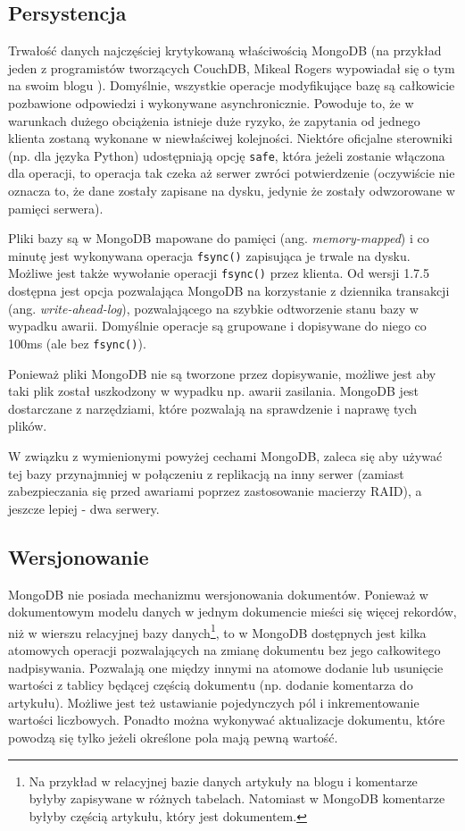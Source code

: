 \subsection*{Persystencja}

Trwałość danych najczęściej krytykowaną właściwością MongoDB (na przykład jeden z programistów tworzących CouchDB, Mikeal Rogers wypowiadał się o tym na swoim blogu \cite{mongodb-durability}).
Domyślnie, wszystkie operacje modyfikujące bazę są całkowicie pozbawione odpowiedzi i wykonywane asynchronicznie.
Powoduje to, że w warunkach dużego obciążenia istnieje duże ryzyko, że zapytania od jednego klienta zostaną wykonane w niewłaściwej kolejności.
Niektóre oficjalne sterowniki (np. dla języka Python) udostępniają opcję \verb+safe+, która jeżeli zostanie włączona dla operacji, to operacja tak czeka aż serwer zwróci potwierdzenie (oczywiście nie oznacza to, że dane zostały zapisane na dysku, jedynie że zostały odwzorowane w pamięci serwera).

Pliki bazy są w MongoDB mapowane do pamięci (ang. \emph{memory-mapped}) i co minutę jest wykonywana operacja \verb+fsync()+ zapisująca je trwale na dysku.
Możliwe jest także wywołanie operacji \verb+fsync()+ przez klienta.
Od wersji 1.7.5 dostępna jest opcja pozwalająca MongoDB na korzystanie z dziennika transakcji (ang. \emph{write-ahead-log}), pozwalającego na szybkie odtworzenie stanu bazy w wypadku awarii.
Domyślnie operacje są grupowane i dopisywane do niego co 100ms (ale bez \verb+fsync()+).

Ponieważ pliki MongoDB nie są tworzone przez dopisywanie, możliwe jest aby taki plik został uszkodzony w wypadku np. awarii zasilania.
MongoDB jest dostarczane z narzędziami, które pozwalają na sprawdzenie i naprawę tych plików.

W związku z wymienionymi powyżej cechami MongoDB, zaleca się aby używać tej bazy przynajmniej w połączeniu z replikacją na inny serwer (zamiast zabezpieczania się przed awariami poprzez zastosowanie macierzy RAID), a jeszcze lepiej - dwa serwery.

\subsection*{Wersjonowanie}

MongoDB nie posiada mechanizmu wersjonowania dokumentów.
Ponieważ w dokumentowym modelu danych w jednym dokumencie mieści się więcej rekordów, niż w wierszu relacyjnej bazy danych\footnote{Na przykład w relacyjnej bazie danych artykuły na blogu i komentarze byłyby zapisywane w różnych tabelach. Natomiast w MongoDB komentarze byłyby częścią artykułu, który jest dokumentem.}, to w MongoDB dostępnych jest kilka atomowych operacji pozwalających na zmianę dokumentu bez jego całkowitego nadpisywania.
Pozwalają one między innymi na atomowe dodanie lub usunięcie wartości z tablicy będącej częścią dokumentu (np. dodanie komentarza do artykułu).
Możliwe jest też ustawianie pojedynczych pól i inkrementowanie wartości liczbowych.
Ponadto można wykonywać aktualizacje dokumentu, które powodzą się tylko jeżeli określone pola mają pewną wartość.

